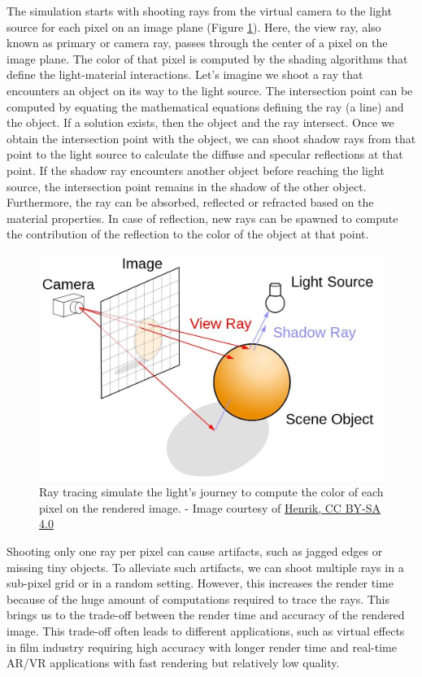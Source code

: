 The simulation starts with shooting rays from the virtual camera to the light source for each pixel on an image plane (Figure \ref{fig:raytracing}). Here, the view ray,  also known as primary or camera ray, passes through the center of a pixel on the image plane. The color of that pixel is computed by the shading algorithms that define the light-material interactions. Let's imagine we shoot a ray that encounters an object on its way to the light source. The intersection point can be computed by equating the mathematical equations defining the ray (a line) and the object. If a solution exists, then the object and the ray intersect. Once we obtain the intersection point with the object, we can shoot shadow rays from that point to the light source to calculate the diffuse and specular reflections at that point. If the shadow ray encounters another object before reaching the light source,  the intersection point remains in the shadow of the other object. Furthermore, the ray can be absorbed, reflected or refracted based on the material properties. In case of reflection, new rays can be spawned to compute the contribution of the reflection to the color of the object at that point.



\begin{figure}[h]
  \centering
   \includegraphics[width=0.5\linewidth]{Images/ray-tracing-image-1.jpg}
   \caption{Ray tracing simulate the light's journey to compute the color of each pixel on the rendered image. - Image courtesy of \href{https://commons.wikimedia.org/wiki/File:Ray_trace_diagram.svg}{Henrik, CC BY-SA 4.0}}
   \label{fig:raytracing}
\end{figure}

Shooting only one ray per pixel can cause artifacts, such as jagged edges or missing tiny objects. To alleviate such artifacts, we can shoot multiple rays in a sub-pixel grid or in a random setting. However, this increases the render time  because of the huge amount of computations required to trace the rays. This brings us to the trade-off between the render time and accuracy of the rendered image. This trade-off often leads to different applications, such as virtual effects in film industry requiring high accuracy with longer render time and real-time AR/VR applications with fast rendering but relatively low quality.

